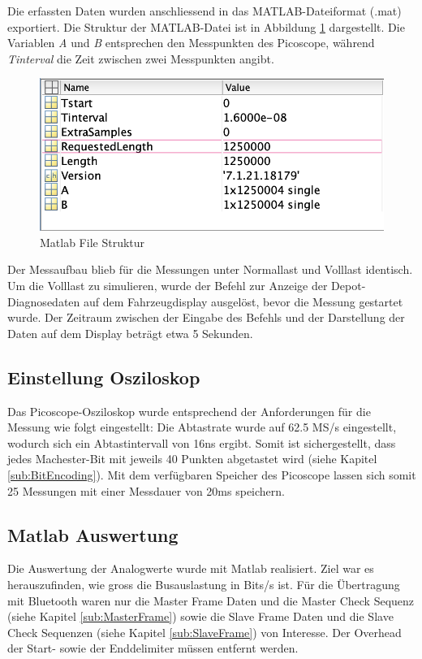 Die erfassten Daten wurden anschliessend in das MATLAB-Dateiformat (.mat) exportiert. Die Struktur der MATLAB-Datei ist in Abbildung \ref{fig:MatlabFileStruktur} dargestellt. Die Variablen \textit{A} und \textit{B} entsprechen den Messpunkten des Picoscope, während \textit{Tinterval} die Zeit zwischen zwei Messpunkten angibt. 

\begin{figure}[H]
    \centering
    \includegraphics[width=0.5\linewidth]{Figures/Chap3/Busauslastung/Matlab_file_struktur.png}
    \caption{Matlab File Struktur}
    \label{fig:MatlabFileStruktur}
\end{figure}

Der Messaufbau blieb für die Messungen unter Normallast und Volllast identisch. Um die Volllast zu simulieren, wurde der Befehl zur Anzeige der Depot-Diagnosedaten auf dem Fahrzeugdisplay ausgelöst, bevor die Messung gestartet wurde. Der Zeitraum zwischen der Eingabe des Befehls und der Darstellung der Daten auf dem Display beträgt etwa 5 Sekunden.

\subsection{Einstellung Osziloskop}
Das Picoscope-Osziloskop wurde entsprechend der Anforderungen für die Messung wie folgt eingestellt: Die Abtastrate wurde auf 62.5 MS/s eingestellt, wodurch sich ein Abtastintervall von 16ns ergibt. Somit ist sichergestellt, dass jedes Machester-Bit mit jeweils 40 Punkten abgetastet wird (siehe Kapitel \ref{sub:BitEncoding}). Mit dem verfügbaren Speicher des Picoscope lassen sich somit 25 Messungen mit einer Messdauer von 20ms speichern.

\subsection{Matlab Auswertung}
Die Auswertung der Analogwerte wurde mit Matlab realisiert. Ziel war es herauszufinden, wie gross die Busauslastung in Bits/s ist. Für die Übertragung mit Bluetooth waren nur die Master Frame Daten und die Master Check Sequenz (siehe Kapitel \ref{sub:MasterFrame}) sowie die Slave Frame Daten und die Slave Check Sequenzen (siehe Kapitel \ref{sub:SlaveFrame}) von Interesse. Der Overhead der Start- sowie der Enddelimiter müssen entfernt werden. 

